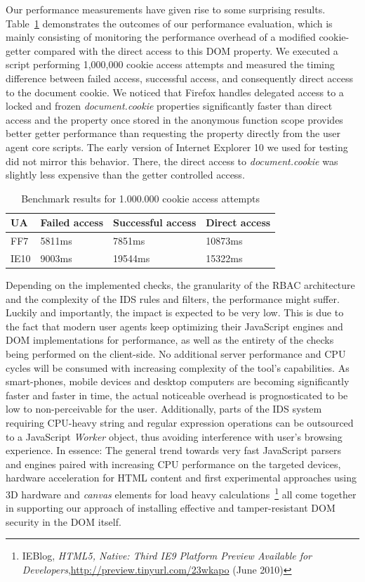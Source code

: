     Our performance measurements have given rise to some surprising results. Table~\ref{tbl:rbac-performance} demonstrates the outcomes of our performance evaluation, which is mainly consisting of monitoring the performance overhead of a modified cookie-getter compared with the direct access to this DOM property. We executed a script performing 1,000,000 cookie access attempts and measured the timing difference between failed access, successful access, and consequently direct access to the document cookie. We noticed that Firefox handles delegated access to a locked and frozen \textit{document.cookie} properties significantly faster than direct access and the property once stored in the anonymous function scope provides better getter performance than requesting the property directly from the user agent core scripts. The early version of Internet Explorer 10 we used for testing did not mirror this behavior. There, the direct access to \textit{document.cookie} was slightly less expensive than the getter controlled access. \\

\begin{table}
  \centering
    \begin{tabular}{| l | l | l | l |}
    \hline
    UA & Failed access & Successful access & Direct access  \\ \hline
    FF7  & 5811ms & 7851ms  & 10873ms \\ \hline
    IE10 & 9003ms & 19544ms & 15322ms \\ \hline
    \end{tabular}
    \label{tbl:rbac-performance}
    \caption{Benchmark results for 1.000.000 cookie access attempts}
\end{table}

    Depending on the implemented checks, the granularity of the RBAC architecture and the complexity of the IDS rules and filters, the performance might suffer. Luckily and importantly, the impact is expected to be very low. This is due to the fact that modern user agents keep optimizing their JavaScript engines and DOM implementations for performance, as well as the entirety of the checks being performed on the client-side. No additional server performance and CPU cycles will be consumed with increasing complexity of the tool's capabilities. As smart-phones, mobile devices and desktop computers are becoming significantly faster and faster in time, the actual noticeable overhead is prognosticated to be low to non-perceivable for the user. Additionally, parts of the IDS system requiring CPU-heavy string and regular expression operations can be outsourced to a JavaScript \textit{Worker} object, thus avoiding interference with user's browsing experience. In essence: The general trend towards very fast JavaScript parsers and engines paired with increasing CPU performance on the targeted devices, hardware acceleration for HTML content and first experimental approaches using 3D hardware and \textit{canvas} elements for load heavy calculations~\footnote{IEBlog, \textit{HTML5, Native: Third IE9 Platform Preview Available for Developers},\url{http://preview.tinyurl.com/23wkapo} (June 2010)} all come together in supporting our approach of installing effective and tamper-resistant DOM security in the DOM itself.

